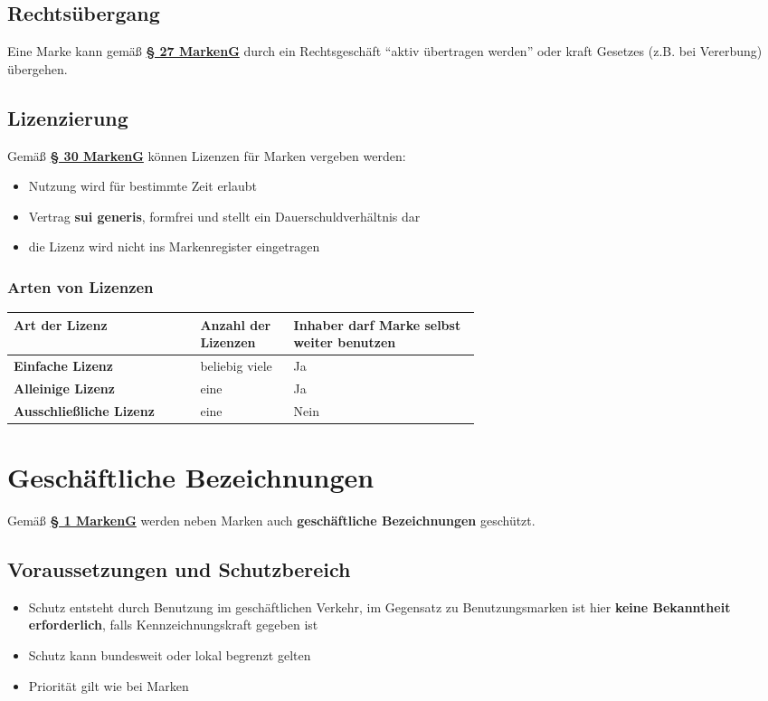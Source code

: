 \documentclass[12pt,A4]{extarticle}
\newcommand{\highlight}[1]{\textcolor{highlightColor}{\textbf{#1}}}
\newcommand{\markenG}[2][]{\textbf{\textcolor{markenGesetzLink}{\href{https://www.gesetze-im-internet.de/markeng/__#2.html}{§ #2 \ifthenelse{\equal{#1}{}}{}{#1 }MarkenG}}}}
\begin{document}
\subsection{Rechtsübergang}
Eine Marke kann gemäß \markenG{27} durch ein Rechtsgeschäft ``aktiv übertragen werden'' oder kraft Gesetzes (z.B. bei Vererbung) übergehen.

\subsection{Lizenzierung}
Gemäß \markenG{30} können Lizenzen für Marken vergeben werden:
\begin{itemize}
  \item{Nutzung wird für bestimmte Zeit erlaubt}
  \item{Vertrag \textbf{sui generis}, formfrei und stellt ein Dauerschuldverhältnis dar}
  \item{die Lizenz wird nicht ins Markenregister eingetragen}
\end{itemize}

\subsubsection{Arten von Lizenzen}
\bgroup
\def\arraystretch{1.5}
\begin{table}[h]
  \begin{tabular}{|l|p{0.2\linewidth}|p{0.4\linewidth}|}
    \hline \rowcolor{gray!30}
    Art der Lizenz                  & Anzahl der Lizenzen & Inhaber darf Marke selbst weiter benutzen \\ \hline
    \textbf{Einfache Lizenz}      & beliebig viele      & Ja                                        \\ \hline
    \textbf{Alleinige Lizenz}       & eine                & Ja                                        \\ \hline
    \textbf{Ausschließliche Lizenz} & eine                & Nein                                      \\ \hline
  \end{tabular}
\end{table}

\section{Geschäftliche Bezeichnungen}
Gemäß \markenG{1} werden neben Marken auch \highlight{geschäftliche Bezeichnungen} geschützt.

\subsection{Voraussetzungen und Schutzbereich}
\begin{itemize}
  \item{Schutz entsteht durch Benutzung im geschäftlichen Verkehr, im Gegensatz zu Benutzungsmarken ist hier \textbf{keine Bekanntheit erforderlich}, falls Kennzeichnungskraft gegeben ist}
  \item{Schutz kann bundesweit oder lokal begrenzt gelten}
  \item{Priorität gilt wie bei Marken}
\end{itemize}
\end{document}
